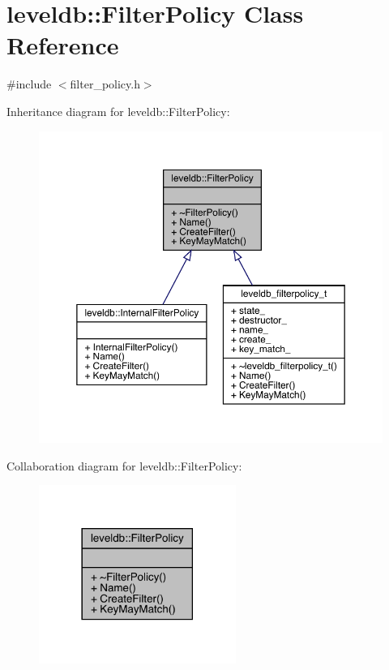 \hypertarget{classleveldb_1_1_filter_policy}{}\section{leveldb\+::Filter\+Policy Class Reference}
\label{classleveldb_1_1_filter_policy}


{\ttfamily \#include $<$filter\+\_\+policy.\+h$>$}



Inheritance diagram for leveldb\+::Filter\+Policy\+:
\nopagebreak
\begin{figure}[H]
\begin{center}
\leavevmode
\includegraphics[width=350pt]{classleveldb_1_1_filter_policy__inherit__graph}
\end{center}
\end{figure}


Collaboration diagram for leveldb\+::Filter\+Policy\+:
\nopagebreak
\begin{figure}[H]
\begin{center}
\leavevmode
\includegraphics[width=182pt]{classleveldb_1_1_filter_policy__coll__graph}
\end{center}
\end{figure}
